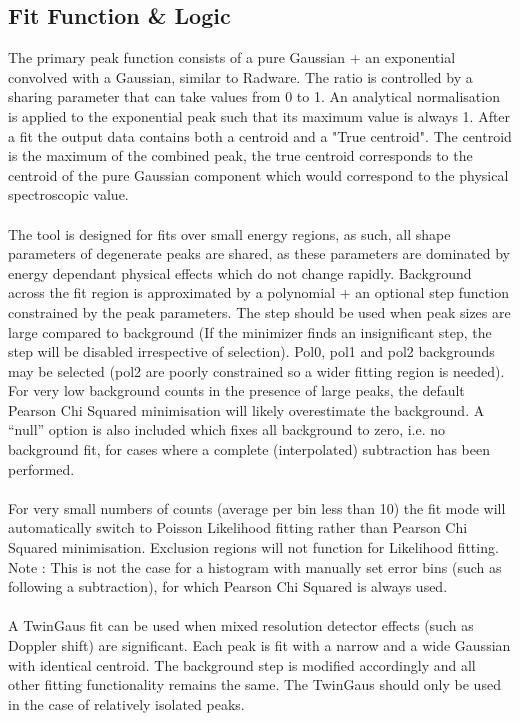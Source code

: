 \documentclass[a4paper,10pt]{article}
\begin{document}
\subsection{Fit Function \& Logic}
The primary peak function consists of a pure Gaussian + an exponential convolved with a Gaussian, similar to Radware. The ratio is controlled by a sharing parameter that can take values from 0 to 1. An analytical normalisation is applied to the exponential peak such that its maximum value is always 1. After a fit the output data contains both a centroid and a "True centroid". The centroid is the maximum of the combined peak, the true centroid corresponds to the centroid of the pure Gaussian component which would correspond to the physical spectroscopic value.  
\\
\\
The tool is designed for fits over small energy regions, as such, all shape parameters of degenerate peaks are shared, as these parameters are dominated by energy dependant physical effects which do not change rapidly. Background across the fit region is approximated by a polynomial + an optional step function constrained by the peak parameters. The step should be used when peak sizes are large compared to background (If the minimizer finds an insignificant step, the step will be disabled irrespective of selection).
Pol0, pol1 and pol2 backgrounds may be selected (pol2 are poorly constrained so a wider fitting region is needed).
For very low background counts in the presence of large peaks, the default Pearson Chi Squared minimisation will likely overestimate the background.
A ``null'' option is also included which fixes all background to zero, i.e. no background fit, for cases where a complete (interpolated) subtraction has been performed.
\\
\\ 
For very small numbers of counts (average per bin less than 10) the fit mode will automatically switch to Poisson Likelihood fitting rather than Pearson Chi Squared minimisation. Exclusion regions will not function for Likelihood fitting. Note : This is not the case for a histogram with manually set error bins (such as following a subtraction), for which Pearson Chi Squared is always used.
\\
\\
A TwinGaus fit can be used when mixed resolution detector effects (such as Doppler shift) are significant. Each peak is fit with a narrow and a wide Gaussian with identical centroid. The background step is modified accordingly and all other fitting functionality remains the same. The TwinGaus should only be used in the case of relatively isolated peaks.
\end{document}
